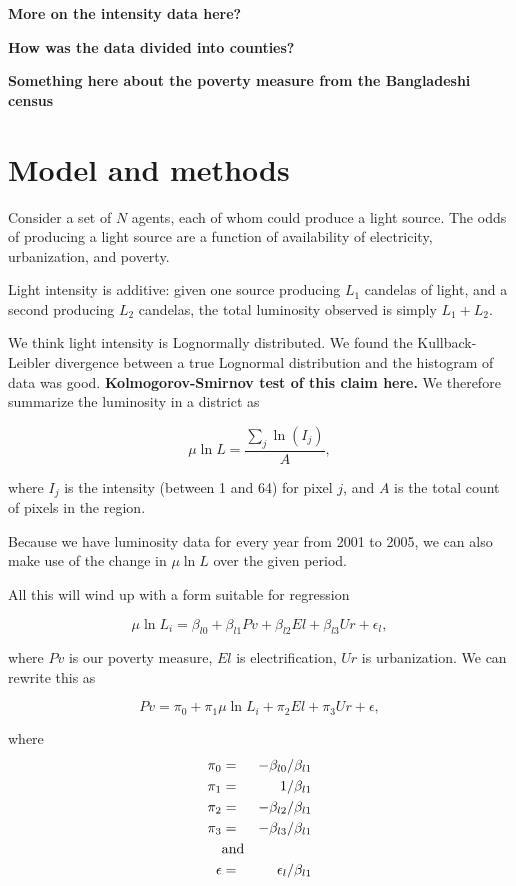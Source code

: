 \documentclass{article}
\begin{document}
{\bf More on the intensity data here?}

{\bf How was the data divided into counties?}


{\bf Something here about the poverty measure from the Bangladeshi census}



\section{Model and methods}

Consider a set of $N$ agents, each of whom could produce a light source. The odds of
producing a light source are a function of availability of electricity, urbanization, and poverty.

Light intensity is additive: given one source producing $L_1$ candelas of light, and a
second producing $L_2$ candelas, the total luminosity observed is simply $L_1+L_2$.

We think light intensity is Lognormally distributed.
We found the Kullback-Leibler divergence between a true
Lognormal distribution and the histogram of data was good.
 {\bf Kolmogorov-Smirnov test of this
claim here.} We therefore summarize the luminosity in a district as 

$$\mu\ln L = \frac{\sum_j \ln(I_j)}{A},$$

where $I_j$ is the intensity (between 1 and 64) for pixel $j$, and $A$ is the total count
of pixels in the region.

Because we have luminosity data for
every year from 2001 to 2005, we can also make use of the change in $\mu\ln L$ over the given period.

All this will wind up with a form suitable for regression 

\[
\mu\ln L_i = \beta_{l0} + \beta_{l1} Pv + \beta_{l2} El + \beta_{l3} Ur + \epsilon_l,
\]

where $Pv$ is our poverty measure, $El$ is electrification, $Ur$ is urbanization.
We can rewrite this as 

\[\label{povertyregression}
Pv = \pi_0 + \pi_1 \mu\ln L_i  + \pi_2 El + \pi_3 Ur + \epsilon,
\]

where 
\begin{eqnarray*}
\pi_0 &=& -\beta_{l0}/\beta_{l1} \\
\pi_1 &=& 1/\beta_{l1} \\
\pi_2 &=& -\beta_{l2}/\beta_{l1} \\
\pi_3 &=& -\beta_{l3}/\beta_{l1} \\
    &\hbox{and}\\
\epsilon &=& \epsilon_l/\beta_{l1} \\
\end{eqnarray*}
\end{document}
